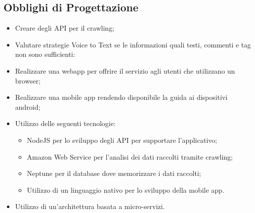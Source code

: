 \subsection{Obblighi di Progettazione}
\begin{itemize}
  \item Creare degli API per il crawling;
  \item Valutare strategie Voice to Text se le informazioni quali testi, commenti e tag non sono sufficienti:
  \item Realizzare una webapp per offrire il servizio agli utenti che utilizzano un browser;
  \item Realizzare una mobile app rendendo disponibile la guida ai dispositivi android;
  \item Utilizzo delle seguenti tecnologie: 
  \begin{itemize}
    \item NodeJS per lo sviluppo degli API per supportare l’applicativo;
    \item Amazon Web Service per l'analisi dei dati raccolti tramite crawling;
    \item Neptune per il database dove memorizzare i dati raccolti;
    \item Utilizzo di un linguaggio nativo per lo sviluppo della mobile app.
  \end{itemize}
  \item Utilizzo di un'architettura basata a micro-servizi.

\end{itemize}